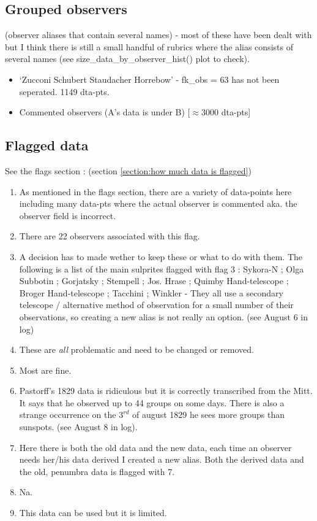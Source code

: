 \documentclass[12pt]{article}
\begin{document}
\subsection{Grouped observers} 
(observer aliases that contain several names) - most of these have been dealt with but I think there is still a small handful of rubrics where the alias consists of several names (see size\_data\_by\_observer\_hist() plot to check).
\begin{itemize}
    \item `Zucconi Schubert Staudacher Horrebow' - fk\_obs = 63 has not been seperated. 1149 dta-pts.
\end{itemize}

\begin{itemize}
    \item Commented observers (A's data is under B) [$\approx 3000$ dta-pts]
\end{itemize}

\subsection{Flagged data}\label{section:issues with flags}
See the flags section : (section \ref{section:how much data is flagged})
\begin{enumerate}
    \item As mentioned in the flags section, there are a variety of data-points here including many data-pts where the actual observer is commented aka. the observer field is incorrect.
    \item There are 22 observers associated with this flag.
    \item A decision has to made wether to keep these or what to do with them. The following is a list of the main sulprites flagged with flag 3 : Sykora-N ; Olga Subbotin ; Gorjatsky ; Stempell ; Jos. Hrase ; Quimby Hand-telescope ; Broger Hand-telescope ; Tacchini ; Winkler - They all use a secondary telescope / alternative method of observation for a small number of their observations, so creating a new alias is not really an option. (see August 6 in log)
    \item These are \textit{all} problematic and need to be changed or removed.
    \item Most are fine.
    \item Pastorff's 1829 data is ridiculous but it is correctly transcribed from the Mitt. It says that he observed up to 44 groups on some days. There is also a strange occurrence on the $3^{rd}$ of august 1829 he sees more groups than sunspots. (see August 8 in log). 
    \item Here there is both the old data and the new data, each time an observer needs her/his data derived I created a new alias. Both the derived data and the old, penumbra data is flagged with 7.
    \item Na.
    \item This data can be used but it is limited.
\end{enumerate}
\end{document}
